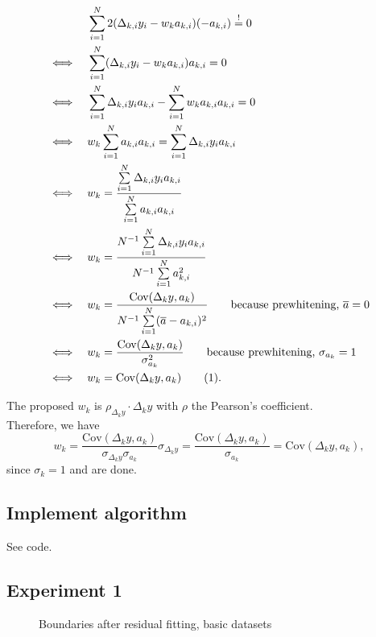 \documentclass{article}
\begin{document}
\newcommand{\Cov}{\mathrm{Cov}}
\newcommand{\Var}{\mathrm{Var}}
\newcommand\numberthis{\addtocounter{equation}{1}\tag{\theequation}}
\begin{align*}
&\quad \sum\limits_{i=1}^N 2(\Delta_{k,i}y_i - w_k a_{k,i})(-a_{k,i}) \overset{!}{=} 0 \\
\iff &\quad \sum\limits_{i=1}^N (\Delta_{k,i}y_i - w_k a_{k,i})a_{k,i} = 0  \\
\iff &\quad\sum\limits_{i=1}^N \Delta_{k,i}y_i a_{k,i} - \sum\limits_{i=1}^N w_k a_{k,i} a_{k,i} = 0 \\
\iff &\quad w_k \sum\limits_{i=1}^N  a_{k,i} a_{k,i} = \sum\limits_{i=1}^N \Delta_{k,i}y_i a_{k,i} \\
\iff &\quad w_k = \frac{\sum\limits_{i=1}^N \Delta_{k,i}y_i a_{k,i}} {\sum\limits_{i=1}^N  a_{k,i} a_{k,i} }\\
\iff &\quad w_k = \frac{N^{-1}\sum\limits_{i=1}^N \Delta_{k,i}y_i a_{k,i}}{N^{-1}\sum\limits_{i=1}^N  a_{k,i}^2}  \\
\iff &\quad w_k = \frac{\Cov(\Delta_ky, a_k)}{N^{-1}\sum\limits_{i=1}^N  (\overline{a} - a_{k,i})^2} \qquad \text{because prewhitening, } \overline{a} = 0 \\
\iff &\quad w_k = \frac{\Cov(\Delta_ky, a_k)}{\sigma_{a_k}^2} \qquad \text{because prewhitening, } \sigma_{a_k} = 1 \\
\iff &\quad w_k = \Cov(\Delta_ky, a_k) \numberthis\label{myeq}.
\end{align*}

The proposed $w_k$ is $\rho_{\Delta_ky} \cdot {\Delta_k}y$ with $\rho$ the Pearson's coefficient. \\ Therefore, we have
\begin{equation*}
w_k= \frac{\Cov(\Delta_ky, a_k)}{\sigma_{\Delta_ky} \sigma_{a_k}} \sigma_{\Delta_ky} = \frac{\Cov(\Delta_ky, a_k)}{\sigma_{a_k}} = \Cov(\Delta_ky, a_k),
\end{equation*}
since \(\sigma_k=1\) and are done.
\subsection{Implement algorithm}
See code.
\subsection{Experiment 1}
	\begin{figure}[H]
	\centering
	
	\caption{\label{resfit1}Boundaries after residual fitting, basic datasets}
     \end{figure}
\end{document}
